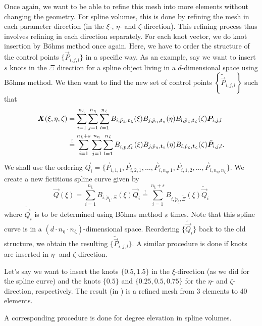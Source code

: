 Once again, we want to be able to refine this mesh into more elements without changing the geometry. For spline volumes, this is done by refining the mesh in each parameter direction (in the $\xi$-, $\eta$- and $\zeta$-direction). This refining process thus involves refining in each direction separately. For each knot vector, we do knot insertion by B\"{o}hms method once again. Here, we have to order the structure of the control points $\{\vec{P}_{i,j,l}\}$ in a specific way. As an example, say we want to insert $s$ knots in the $\Xi$ direction for a spline object living in a $d$-dimensional space using B\"{o}hms method. We then want to find the new set of control points $\left\{\tilde{\vec{P}}_{i,j,l}\right\}$ such that
\begin{align*}
	\vec{X}(\xi,\eta,\zeta) &= \sum_{i=1}^{n_\upxi}\sum_{j=1}^{n_\upeta}\sum_{l=1}^{n_\upzeta} B_{i,\check{p}_\upxi,\Xi}(\xi)B_{j,\check{p}_\upeta,\Eta}(\eta)B_{l,\check{p}_\upzeta,\Zeta}(\zeta)\vec{P}_{i,j,l}\\
	 &\overset{!}{=} \sum_{i=1}^{n_\upxi+s}\sum_{j=1}^{n_\upeta}\sum_{l=1}^{n_\upzeta} B_{i,p,\tilde{\Xi}}(\xi)B_{j,\check{p}_\upeta,\Eta}(\eta)B_{l,\check{p}_\upzeta,\Zeta}(\zeta)\tilde{\vec{P}}_{i,j,l}.
\end{align*}
We shall use the ordering $\vec{Q}_i = \{\vec{P}_{i,1,1}, \vec{P}_{i,2,1},\dots,\vec{P}_{i,n_\upeta,1},\vec{P}_{i,1,2},\dots,\vec{P}_{i,n_\upeta,n_\upzeta}\}$. We create a new fictitious spline curve given by
\begin{equation*}
	\vec{Q}(\xi) = \sum_{i=1}^{n_\upxi} B_{i,\check{p}_\upxi,\Xi}(\xi) \vec{Q}_i \overset{!}{=} \sum_{i=1}^{n_\upxi+s} B_{i,\check{p}_\upxi,\tilde{\Xi}}(\xi) \tilde{\vec{Q}}_i
\end{equation*}
where $\tilde{\vec{Q}}_i$ is to be determined using B\"{o}hms method $s$ times. Note that this spline curve is in a $(d\cdot n_\upeta\cdot n_\upzeta)$-dimensional space. Reordering $\{\tilde{\vec{Q}}_i\}$ back to the old structure, we obtain the resulting $\{\tilde{\vec{P}}_{i,j,l}\}$. A similar procedure is done if knots are inserted in $\eta$- and $\zeta$-direction. 

Let's say we want to insert the knots $\{0.5, 1.5\}$ in the $\xi$-direction (as we did for the spline curve) and the knots $\{0.5\}$ and $\{0.25, 0.5, 0.75\}$ for the $\eta$- and $\zeta$-direction, respectively. The result (in ) is a refined mesh from 3 elements to 40 elements.

A corresponding procedure is done for degree elevation in spline volumes.



